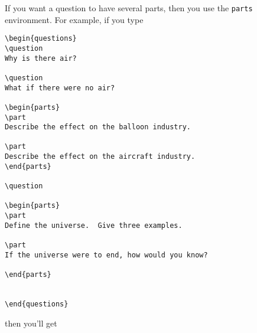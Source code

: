 \documentclass[12pt]{exam}
\begin{document}
If you want a question to have several parts, then you use the
\verb"parts" environment.  For example, if you type
%
\begin{verbatim}
\begin{questions}
\question
Why is there air?

\question
What if there were no air?

\begin{parts}
\part
Describe the effect on the balloon industry.

\part
Describe the effect on the aircraft industry.
\end{parts}

\question

\begin{parts}
\part
Define the universe.  Give three examples.

\part
If the universe were to end, how would you know?

\end{parts}


\end{questions}
\end{verbatim}
%
then you'll get
\end{document}
